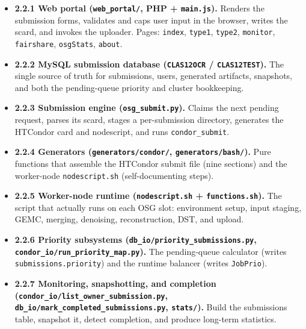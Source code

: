 \begin{itemize}
  \item \textbf{2.2.1 Web portal (\texttt{web\_\allowbreak{}portal/\allowbreak{}}, PHP + \texttt{main.\allowbreak{}js}).} Renders the submission forms, validates and caps user input in the browser, writes the scard, and invokes the uploader. Pages: \texttt{index}, \texttt{type1}, \texttt{type2}, \texttt{monitor}, \texttt{fairshare}, \texttt{osgStats}, \texttt{about}.
  \item \textbf{2.2.2 MySQL submission database (\texttt{CLAS12OCR} / \texttt{CLAS12TEST}).} The single source of truth for submissions, users, generated artifacts, snapshots, and both the pending-queue priority and cluster bookkeeping.
  \item \textbf{2.2.3 Submission engine (\texttt{osg\_\allowbreak{}submit.\allowbreak{}py}).} Claims the next pending request, parses its scard, stages a per-submission directory, generates the HTCondor card and nodescript, and runs \texttt{condor\_\allowbreak{}submit}.
  \item \textbf{2.2.4 Generators (\texttt{generators/\allowbreak{}condor/\allowbreak{}}, \texttt{generators/\allowbreak{}bash/\allowbreak{}}).} Pure functions that assemble the HTCondor submit file (nine sections) and the worker-node \texttt{nodescript.\allowbreak{}sh} (self-documenting steps).
  \item \textbf{2.2.5 Worker-node runtime (\texttt{nodescript.\allowbreak{}sh} + \texttt{functions.\allowbreak{}sh}).} The script that actually runs on each OSG slot: environment setup, input staging, GEMC, merging, denoising, reconstruction, DST, and upload.
  \item \textbf{2.2.6 Priority subsystems (\texttt{db\_\allowbreak{}io/\allowbreak{}priority\_\allowbreak{}submissions.\allowbreak{}py}, \texttt{condor\_\allowbreak{}io/\allowbreak{}run\_\allowbreak{}priority\_\allowbreak{}map.\allowbreak{}py}).} The pending-queue calculator (writes \texttt{submissions.\allowbreak{}priority}) and the runtime balancer (writes \texttt{JobPrio}).
  \item \textbf{2.2.7 Monitoring, snapshotting, and completion (\texttt{condor\_\allowbreak{}io/\allowbreak{}list\_\allowbreak{}owner\_\allowbreak{}submission.\allowbreak{}py}, \texttt{db\_\allowbreak{}io/\allowbreak{}mark\_\allowbreak{}completed\_\allowbreak{}submissions.\allowbreak{}py}, \texttt{stats/\allowbreak{}}).} Build the submissions table, snapshot it, detect completion, and produce long-term statistics.
\end{itemize}

